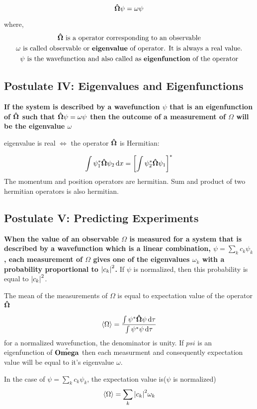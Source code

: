 \documentclass[11pt]{article}
\theoremstyle{definition}
\begin{document}
\begin{equation*}
    \vectorunit{\Omega} \psi = \omega \psi
\end{equation*}

where,
\begin{gather*}
    \vectorunit{\Omega} \text{ is a operator corresponding to an observable} \\
    \omega\text{ is called observable or \textbf{eigenvalue} of operator. It is always a real value.}\\
    \psi \text{ is the wavefunction and also called as \textbf{eigenfunction} of the operator}
\end{gather*}
\subsection{Postulate IV: Eigenvalues and Eigenfunctions}
\textbf{If the system is described by a wavefunction $\psi$ that is an eigenfunction of $\vectorunit{\Omega}$ such that $\vectorunit{\Omega} \psi = \omega \psi$ then the outcome of a measurement of $\Omega$ will be the eigenvalue $\omega$}

eigenvalue is real $\iff$ the operator $\vectorunit{\Omega}$ is Hermitian:

\begin{equation*}
    \int \psi_1 ^* \vectorunit{\Omega} \psi_2 \dd{x} = \left[ \int \psi_2 ^* \vectorunit{\Omega} \psi_1 \right]^*
\end{equation*}
The momentum and position operators are hermitian. Sum and product of two hermitian operators is also hermitian.

\subsection{Postulate V: Predicting Experiments}
\textbf{When the value of an observable $\Omega$ is measured for a system that is described by a wavefunction which is a linear combination, $\psi = \sum_k c_k \psi_k$, each measurement of $\Omega$ gives one of the eigenvalues $\omega_k$ with a probability proportional to $\abs{c_k}^2$.}
If $\psi$ is normalized, then this probability is equal to $\abs{c_k}^2$.


\begin{shaded}
The mean of the measurements of $\Omega$ is equal to expectation value of the operator $\vectorunit{\Omega}$

\begin{equation*}
    \expval{\Omega} = \frac{\int \psi^* \vectorunit{\Omega} \psi \dd{\tau}}{\int \psi^* \psi \dd{\tau}}
\end{equation*}
for a normalized wavefunction, the denominator is unity. If $psi$ is an eigenfunction of $\vectorunit{Omega}$ then each measurment and consequently expectation value will be equal to it's eigenvalue $\omega$.

In the case of $\psi = \sum_{k} c_k \psi_k$, the expectation value is($\psi$ is normalized)
\begin{equation*}
    \expval{\Omega} = \sum_{k} \abs{c_k}^2 \omega_k
\end{equation*}

\end{shaded}
\end{document}
